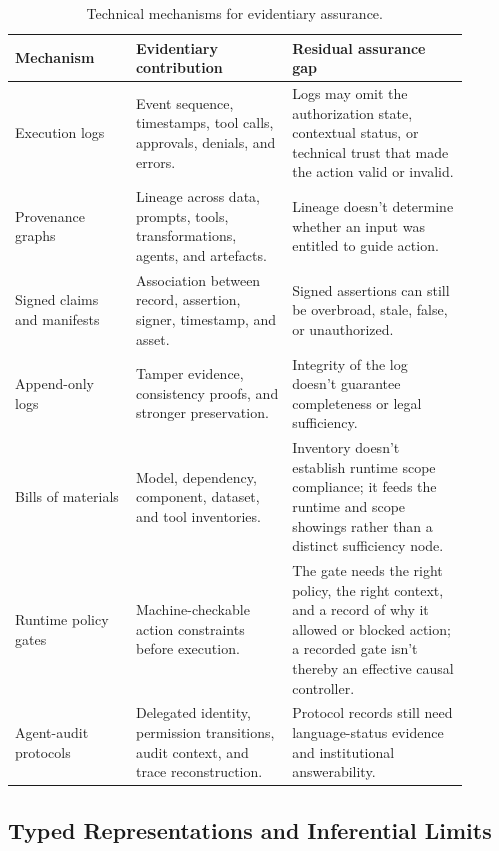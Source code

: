 \begin{table}[tbp]
\small
\centering
\begin{tabular}{>{\raggedright\arraybackslash}p{0.24\linewidth}%
                >{\raggedright\arraybackslash}p{0.31\linewidth}%
                >{\raggedright\arraybackslash}p{0.35\linewidth}}
\toprule
Mechanism & Evidentiary contribution & Residual assurance gap \\
\midrule
Execution logs & Event sequence, timestamps, tool calls, approvals, denials, and errors. & Logs may omit the authorization state, contextual status, or technical trust that made the action valid or invalid. \\
Provenance graphs & Lineage across data, prompts, tools, transformations, agents, and artefacts. & Lineage doesn't determine whether an input was entitled to guide action. \\
Signed claims and manifests & Association between record, assertion, signer, timestamp, and asset. & Signed assertions can still be overbroad, stale, false, or unauthorized. \\
Append-only logs & Tamper evidence, consistency proofs, and stronger preservation. & Integrity of the log doesn't guarantee completeness or legal sufficiency. \\
Bills of materials & Model, dependency, component, dataset, and tool inventories. & Inventory doesn't establish runtime scope compliance; it feeds the runtime and scope showings rather than a distinct sufficiency node. \\
Runtime policy gates & Machine-checkable action constraints before execution. & The gate needs the right policy, the right context, and a record of why it allowed or blocked action; a recorded gate isn't thereby an effective causal controller. \\
Agent-audit protocols & Delegated identity, permission transitions, audit context, and trace reconstruction. & Protocol records still need language-status evidence and institutional answerability. \\
\bottomrule
\end{tabular}
\caption{Technical mechanisms for evidentiary assurance.}
\label{tab:technical-mechanisms}
\end{table}
\FloatBarrier

\subsection{Typed Representations and Inferential Limits}

